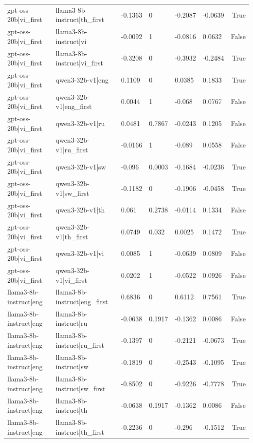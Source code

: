 \begin{table}
\begin{tabular}{llllllr}
gpt-oss-20b|vi_first & llama3-8b-instruct|th_first & -0.1363 & 0 & -0.2087 & -0.0639 & True \\
gpt-oss-20b|vi_first & llama3-8b-instruct|vi & -0.0092 & 1 & -0.0816 & 0.0632 & False \\
gpt-oss-20b|vi_first & llama3-8b-instruct|vi_first & -0.3208 & 0 & -0.3932 & -0.2484 & True \\
gpt-oss-20b|vi_first & qwen3-32b-v1|eng & 0.1109 & 0 & 0.0385 & 0.1833 & True \\
gpt-oss-20b|vi_first & qwen3-32b-v1|eng_first & 0.0044 & 1 & -0.068 & 0.0767 & False \\
gpt-oss-20b|vi_first & qwen3-32b-v1|ru & 0.0481 & 0.7867 & -0.0243 & 0.1205 & False \\
gpt-oss-20b|vi_first & qwen3-32b-v1|ru_first & -0.0166 & 1 & -0.089 & 0.0558 & False \\
gpt-oss-20b|vi_first & qwen3-32b-v1|sw & -0.096 & 0.0003 & -0.1684 & -0.0236 & True \\
gpt-oss-20b|vi_first & qwen3-32b-v1|sw_first & -0.1182 & 0 & -0.1906 & -0.0458 & True \\
gpt-oss-20b|vi_first & qwen3-32b-v1|th & 0.061 & 0.2738 & -0.0114 & 0.1334 & False \\
gpt-oss-20b|vi_first & qwen3-32b-v1|th_first & 0.0749 & 0.032 & 0.0025 & 0.1472 & True \\
gpt-oss-20b|vi_first & qwen3-32b-v1|vi & 0.0085 & 1 & -0.0639 & 0.0809 & False \\
gpt-oss-20b|vi_first & qwen3-32b-v1|vi_first & 0.0202 & 1 & -0.0522 & 0.0926 & False \\
llama3-8b-instruct|eng & llama3-8b-instruct|eng_first & 0.6836 & 0 & 0.6112 & 0.7561 & True \\
llama3-8b-instruct|eng & llama3-8b-instruct|ru & -0.0638 & 0.1917 & -0.1362 & 0.0086 & False \\
llama3-8b-instruct|eng & llama3-8b-instruct|ru_first & -0.1397 & 0 & -0.2121 & -0.0673 & True \\
llama3-8b-instruct|eng & llama3-8b-instruct|sw & -0.1819 & 0 & -0.2543 & -0.1095 & True \\
llama3-8b-instruct|eng & llama3-8b-instruct|sw_first & -0.8502 & 0 & -0.9226 & -0.7778 & True \\
llama3-8b-instruct|eng & llama3-8b-instruct|th & -0.0638 & 0.1917 & -0.1362 & 0.0086 & False \\
llama3-8b-instruct|eng & llama3-8b-instruct|th_first & -0.2236 & 0 & -0.296 & -0.1512 & True \\

\end{tabular}
\end{table}
